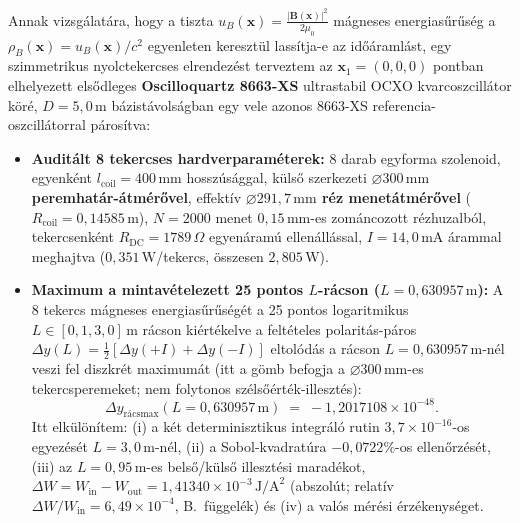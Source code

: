 \documentclass[10pt,a4paper]{article}
\begin{document}
\par
Annak vizsg\'alat\'ara, hogy a tiszta $u_B(\mathbf{x}) = \frac{|\mathbf{B}(\mathbf{x})|^2}{2\mu_0}$ m\'agneses energias\H{u}r\H{u}s\'eg a $\rho_B(\mathbf{x}) = u_B(\mathbf{x})/c^2$ egyenleten kereszt\"ul lass\'itja-e az id\H{o}\'araml\'ast, egy szimmetrikus nyolctekercses elrendez\'est terveztem az $\mathbf{x}_1 = (0,0,0)$ pontban elhelyezett els\H{o}dleges \textbf{Oscilloquartz 8663-XS} ultrastabil OCXO kvarcoszcill\'ator k\"or\'e, $D = 5{,}0\,\text{m}$ b\'azist\'avols\'agban egy vele azonos 8663-XS referencia-oszcill\'atorral p\'aros\'itva:
\begin{itemize}\setlength{\itemsep}{1pt}\setlength{\parskip}{0pt}\setlength{\topsep}{1pt}
  \item \textbf{Audit\'alt 8 tekercses hardverparam\'eterek:} 8 darab egyforma szolenoid, egyenk\'ent $l_{\text{coil}} = 400\,\text{mm}$ hossz\'us\'aggal, k\"uls\H{o} szerkezeti \textbf{$\varnothing 300\,\text{mm}$ peremhat\'ar-\'atm\'er\H{o}vel}, effekt\'iv \textbf{$\varnothing 291{,}7\,\text{mm}$ r\'ez menet\'atm\'er\H{o}vel} ($R_{\text{coil}} = 0{,}14585\,\text{m}$), $N = 2000$ menet $0{,}15\,\text{mm}$-es zom\'ancozott r\'ezhuzalb\'ol, tekercsenk\'ent $R_{\text{DC}} = 1789\,\Omega$ egyen\'aram\'u ellen\'all\'assal, $I = 14{,}0\,\text{mA}$ \'arammal meghajtva ($0{,}351\,\text{W}$/tekercs, \"osszesen $2{,}805\,\text{W}$).
  \item \textbf{Maximum a mintav\'etelezett 25 pontos $L$-r\'acson ($L = 0{,}630957\,\text{m}$):} A 8 tekercs m\'agneses energias\H{u}r\H{u}s\'eg\'et a 25 pontos logaritmikus $L \in [0{,}1, 3{,}0]\,\text{m}$ r\'acson ki\'ert\'ekelve a felt\'eteles polarit\'as-p\'aros $\Delta y(L) = \frac{1}{2}[\Delta y(+I) + \Delta y(-I)]$ eltol\'od\'as a r\'acson \textbf{$L = 0{,}630957\,\text{m}$}-n\'el veszi fel diszkr\'et maximum\'at (itt a g\"omb befogja a $\varnothing 300\,\text{mm}$-es tekercsperemeket; nem folytonos sz\'els\H{o}\'ert\'ek-illeszt\'es):
  \begin{equation}
    \Delta y_{\text{r\'acsmax}}(L = 0{,}630957\,\text{m}) \;=\; -1{,}2017108\times 10^{-48}.
  \end{equation}
  Itt elk\"ul\"on\'item: (i) a k\'et determinisztikus integr\'al\'o rutin $3{,}7\times 10^{-16}$-os egyez\'es\'et $L=3{,}0\,\text{m}$-n\'el, (ii) a Sobol-kvadrat\'ura $-0{,}0722\%$-os ellen\H{o}rz\'es\'et, (iii) az $L=0{,}95\,\text{m}$-es bels\H{o}/k\"uls\H{o} illeszt\'esi marad\'ekot, $\Delta W = W_{\text{in}} - W_{\text{out}} = 1{,}41340\times 10^{-3}\,\text{J/A}^2$ (abszol\'ut; relat\'iv $\Delta W/W_{\text{in}} = 6{,}49\times 10^{-4}$, B.\ f\"uggel\'ek) \'es (iv) a val\'os m\'er\'esi \'erz\'ekenys\'eget.

\end{itemize}
\end{document}
